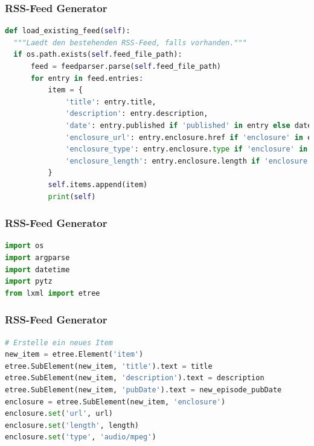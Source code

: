 \documentclass{beamer}
\begin{document}
\begin{frame}[fragile]
\frametitle{RSS-Feed Generator}
\begin{lstlisting}[language=Python, caption=Feedparser Bug]
def load_existing_feed(self):
  """Laedt den bestehenden RSS-Feed, falls vorhanden."""
  if os.path.exists(self.feed_file_path):
      feed = feedparser.parse(self.feed_file_path)
      for entry in feed.entries:
          item = {
              'title': entry.title,
              'description': entry.description,
              'date': entry.published if 'published' in entry else datetime.now().isoformat(),
              'enclosure_url': entry.enclosure.href if 'enclosure' in entry else None,
              'enclosure_type': entry.enclosure.type if 'enclosure' in entry else None,
              'enclosure_length': entry.enclosure.length if 'enclosure' in entry else None
          }
          self.items.append(item)
          print(self)
\end{lstlisting}
\end{frame}

\begin{frame}[fragile]
\frametitle{RSS-Feed Generator}
\begin{lstlisting}[language=Python, caption=RSS-Feed Generator imports]
import os
import argparse
import datetime
import pytz
from lxml import etree
\end{lstlisting}
\end{frame}

\begin{frame}[fragile]
\frametitle{RSS-Feed Generator}
\begin{lstlisting}[language=Python, caption=Erstellen eines neuen Feed-Items]
# Erstelle ein neues Item
new_item = etree.Element('item')
etree.SubElement(new_item, 'title').text = title
etree.SubElement(new_item, 'description').text = description
etree.SubElement(new_item, 'pubDate').text = new_episode_pubDate
enclosure = etree.SubElement(new_item, 'enclosure')
enclosure.set('url', url)
enclosure.set('length', length)
enclosure.set('type', 'audio/mpeg')
\end{lstlisting}
\end{frame}
\end{document}
